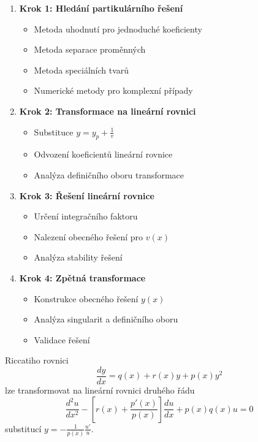 \vspace{0.8\baselineskip}

\begin{method}
\label{met:systematicka-metodologie-riccati}
\begin{enumerate}
\item \textbf{Krok 1: Hledání partikulárního řešení}
\begin{itemize}
\item Metoda uhodnutí pro jednoduché koeficienty
\item Metoda separace proměnných
\item Metoda speciálních tvarů
\item Numerické metody pro komplexní případy
\end{itemize}

\item \textbf{Krok 2: Transformace na lineární rovnici}
\begin{itemize}
\item Substituce $y = y_p + \frac{1}{v}$
\item Odvození koeficientů lineární rovnice
\item Analýza definičního oboru transformace
\end{itemize}

\item \textbf{Krok 3: Řešení lineární rovnice}
\begin{itemize}
\item Určení integračního faktoru
\item Nalezení obecného řešení pro $v(x)$
\item Analýza stability řešení
\end{itemize}

\item \textbf{Krok 4: Zpětná transformace}
\begin{itemize}
\item Konstrukce obecného řešení $y(x)$
\item Analýza singularit a definičního oboru
\item Validace řešení
\end{itemize}
\end{enumerate}
\end{method}

\vspace{0.8\baselineskip}

\begin{theorem}
\label{th:vztah-linearni-2rad}
Riccatiho rovnici
\[
\frac{dy}{dx} = q(x) + r(x)y + p(x)y^2
\]
lze transformovat na lineární rovnici druhého řádu
\[
\frac{d^2u}{dx^2} - \left[r(x) + \frac{p'(x)}{p(x)}\right]\frac{du}{dx} + p(x)q(x)u = 0
\]
substitucí $y = -\frac{1}{p(x)}\frac{u'}{u}$.
\end{theorem}

